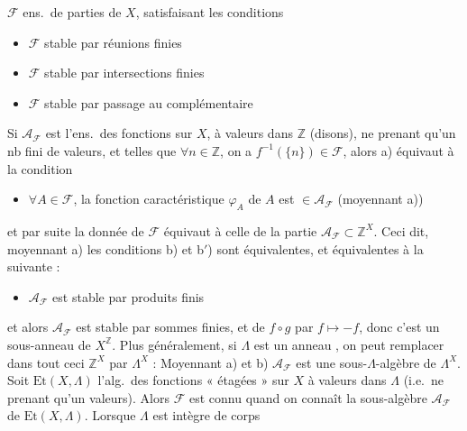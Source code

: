 \documentclass[11pt,a4paper]{article}
\begin{document}
$\mathcal{F}$ ens.\ de parties de $X$, satisfaisant les conditions
\begin{itemize}
  \item[a)] $\mathcal{F}$ stable par réunions finies
  \item[b)] $\mathcal{F}$ stable par intersections finies
  \item[c)] $\mathcal{F}$ stable par passage au complémentaire
\end{itemize}
Si \struck{\ill{}} $\mathcal{A}_{\mathcal{F}}$ est l'ens.\ des fonctions sur
$X$, à valeurs dans $\mathbb{Z}$ (disons), ne prenant qu'un nb fini de
valeurs, et telles que $\forall n \in \mathbb{Z}$, on a $f^{-1}(\lbrace n
\rbrace) \in \mathcal{F}$,  alors a) équivaut à
la condition
\begin{itemize}
  \item[a$'$)] $\forall A \in \mathcal{F}$, la fonction caractéristique
  $\varphi_A$ de $A$ est $\in \mathcal{A}_{\mathcal{F}}$ (moyennant a))
\end{itemize}
et par suite la donnée de $\mathcal{F}$ équivaut à celle de la partie
$\mathcal{A}_{\mathcal{F}} \subset \mathbb{Z}^X$. Ceci dit, 
moyennant a) les conditions b) et b$'$) sont équivalentes, et équivalentes à
la suivante :
\begin{itemize}
  \item[b$''$)] $\mathcal{A}_{\mathcal{F}}$ est stable par produits finis
\end{itemize}
et alors $\mathcal{A}_{\mathcal{F}}$ est \struck{\ill{}} stable par sommes
finies, et  de  $f \circ g$
\ill{} par $f \mapsto -f$, donc c'est un sous-anneau  de
$X^{\mathbb{Z}}$. Plus généralement,
si $\Lambda$ est un anneau \struck{\ill{}}, on
peut remplacer dans tout ceci 
$\mathbb{Z}^X$ par $\Lambda^X$ :
Moyennant a) et b) $\mathcal{A}_{\mathcal{F}}$ est une sous-$\Lambda$-algèbre
de  $\Lambda^X$. Soit
$\mathrm{Et}(X,\Lambda)$ l'alg.\ des fonctions « étagées » sur $X$ à valeurs
dans $\Lambda$ (i.e.\ ne prenant qu'un  \struck{\ill{}}
valeurs). Alors $\mathcal{F}$ est connu quand on connaît la sous-algèbre
$\mathcal{A}_{\mathcal{F}}$ de $\mathrm{Et}(X,\Lambda)$. Lorsque $\Lambda$
est intègre de corps
\end{document}
